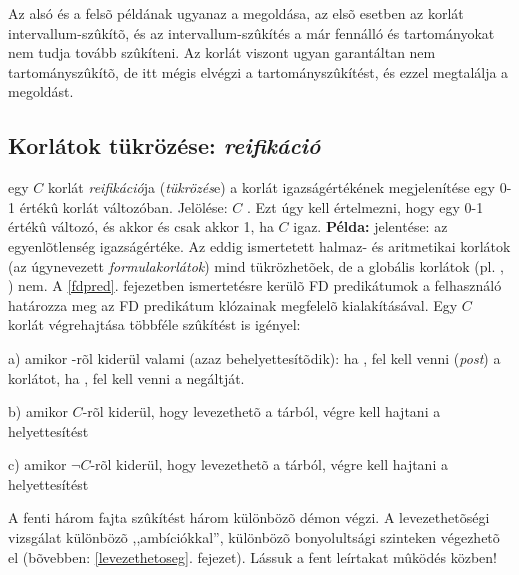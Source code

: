 Az alsó és a felsõ példának ugyanaz a megoldása, az elsõ esetben az 
korlát intervallum-szûkítõ, és az intervallum-szûkítés a már fennálló 
és  tartományokat nem tudja tovább szûkíteni. Az 
korlát viszont ugyan garantáltan nem tartományszûkítõ, de itt mégis elvégzi a
tartományszûkítést, és ezzel megtalálja a megoldást.

\subsection{Korlátok tükrözése: \emph{reifikáció}}

 egy $C$ korlát \emph{reifikáció}ja (\emph{tükrözés}e) a korlát
igazságértékének megjelenítése egy 0-1 értékû korlát változóban. Jelölése:
$C$ . Ezt úgy kell értelmezni, hogy  egy 0-1 értékû változó,
és  akkor és csak akkor 1, ha $C$ igaz.
\br
{\bf Példa:}  jelentése:  az  egyenlõtlenség
igazságértéke.
\br
Az eddig ismertetett halmaz- és aritmetikai korlátok (az úgynevezett \emph{formulakorlátok})
mind tükrözhetõek, de a globális korlátok (pl. , )
nem. A \ref{fdpred}. fejezetben ismertetésre kerülõ FD predikátumok a
felhasználó határozza meg az FD predikátum klózainak megfelelõ kialakításával.
\br
Egy $C$  korlát végrehajtása többféle szûkítést is igényel:

\begin{description}
\item a) amikor -rõl kiderül valami (azaz behelyettesítõdik): ha ,
fel kell venni ({\em post}) a korlátot, ha , fel kell venni a negáltját.
\item b) amikor $C$-rõl kiderül, hogy levezethetõ a tárból, végre kell hajtani
a  helyettesítést
\item c) amikor $\lnot C$-rõl kiderül, hogy levezethetõ a tárból, végre kell
hajtani a  helyettesítést
\end{description}

A fenti három fajta szûkítést három különbözõ démon végzi. A levezethetõségi vizsgálat
különbözõ ,,ambíciókkal'', különbözõ bonyolultsági szinteken végezhetõ el (bõvebben:
\ref{levezethetoseg}. fejezet).
\br
Lássuk a fent leírtakat mûködés közben!

